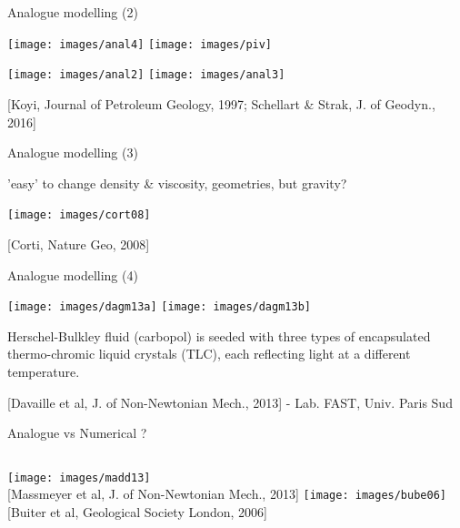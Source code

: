 \documentclass[handout]{beamer}
\begin{document}
\begin{frame}[plain]{Analogue modelling (2)}

\texttt{[image: images/anal4]}
\texttt{[image: images/piv]}

\texttt{[image: images/anal2]}
\texttt{[image: images/anal3]}

{\tiny [Koyi, Journal of Petroleum Geology, 1997; Schellart \& Strak, J. of Geodyn., 2016]}

\end{frame}

\begin{frame}[plain]{Analogue modelling (3)}

'easy' to change density \& viscosity, geometries, but gravity?

\pause 

\texttt{[image: images/cort08]}

{\tiny [Corti, Nature Geo, 2008]}

\end{frame}



\begin{frame}[plain]{Analogue modelling (4)}

\begin{center}
\texttt{[image: images/dagm13a]}
\texttt{[image: images/dagm13b]}
\end{center}
\vspace{-.4cm}
Herschel-Bulkley fluid (carbopol) is seeded with three types of encapsulated thermo-chromic 
liquid crystals (TLC), each reflecting light at a different temperature.

{\tiny [Davaille et al, J. of Non-Newtonian Mech., 2013] - Lab. FAST, Univ. Paris Sud}

\end{frame}

\begin{frame}[plain]{Analogue vs Numerical ?}

\begin{columns}[onlytextwidth]
\texttt{[image: images/madd13]}\\
{\tiny [Massmeyer et al, J. of Non-Newtonian Mech., 2013]}
\texttt{[image: images/bube06]}\\
{\tiny [Buiter et al, Geological Society London, 2006]}
\end{columns}

\end{frame}
\end{document}
